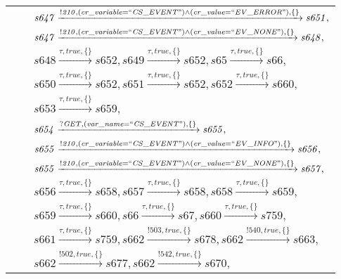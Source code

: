 \begin{tabular}{lcp{350px}}
& & $\mathit{s647}\xrightarrow{\mathit{!210}, \mathit{(cr\_variable = ``CS\_EVENT") \land (cr\_value = ``EV\_ERROR")}, \{\}}\mathit{s651},$ \\
& & $\mathit{s647}\xrightarrow{\mathit{!210}, \mathit{(cr\_variable = ``CS\_EVENT") \land (cr\_value = ``EV\_NONE")}, \{\}}\mathit{s648},$ \\
& & $\mathit{s648}\xrightarrow{\mathit{\tau}, \mathit{true}, \{\}}\mathit{s652},\mathit{s649}\xrightarrow{\mathit{\tau}, \mathit{true}, \{\}}\mathit{s652},\mathit{s65}\xrightarrow{\mathit{\tau}, \mathit{true}, \{\}}\mathit{s66},$ \\
& & $\mathit{s650}\xrightarrow{\mathit{\tau}, \mathit{true}, \{\}}\mathit{s652},\mathit{s651}\xrightarrow{\mathit{\tau}, \mathit{true}, \{\}}\mathit{s652},\mathit{s652}\xrightarrow{\mathit{\tau}, \mathit{true}, \{\}}\mathit{s660},$ \\
& & $\mathit{s653}\xrightarrow{\mathit{\tau}, \mathit{true}, \{\}}\mathit{s659},$ \\
& & $\mathit{s654}\xrightarrow{\mathit{?GET}, \mathit{(var\_name = ``CS\_EVENT")}, \{\}}\mathit{s655},$ \\
& & $\mathit{s655}\xrightarrow{\mathit{!210}, \mathit{(cr\_variable = ``CS\_EVENT") \land (cr\_value = ``EV\_INFO")}, \{\}}\mathit{s656},$ \\
& & $\mathit{s655}\xrightarrow{\mathit{!210}, \mathit{(cr\_variable = ``CS\_EVENT") \land (cr\_value = ``EV\_NONE")}, \{\}}\mathit{s657},$ \\
& & $\mathit{s656}\xrightarrow{\mathit{\tau}, \mathit{true}, \{\}}\mathit{s658},\mathit{s657}\xrightarrow{\mathit{\tau}, \mathit{true}, \{\}}\mathit{s658},\mathit{s658}\xrightarrow{\mathit{\tau}, \mathit{true}, \{\}}\mathit{s659},$ \\
& & $\mathit{s659}\xrightarrow{\mathit{\tau}, \mathit{true}, \{\}}\mathit{s660},\mathit{s66}\xrightarrow{\mathit{\tau}, \mathit{true}, \{\}}\mathit{s67},\mathit{s660}\xrightarrow{\mathit{\tau}, \mathit{true}, \{\}}\mathit{s759},$ \\
& & $\mathit{s661}\xrightarrow{\mathit{\tau}, \mathit{true}, \{\}}\mathit{s759},\mathit{s662}\xrightarrow{\mathit{!503}, \mathit{true}, \{\}}\mathit{s678},\mathit{s662}\xrightarrow{\mathit{!540}, \mathit{true}, \{\}}\mathit{s663},$ \\
& & $\mathit{s662}\xrightarrow{\mathit{!502}, \mathit{true}, \{\}}\mathit{s677},\mathit{s662}\xrightarrow{\mathit{!542}, \mathit{true}, \{\}}\mathit{s670},$ \\

\end{tabular}
